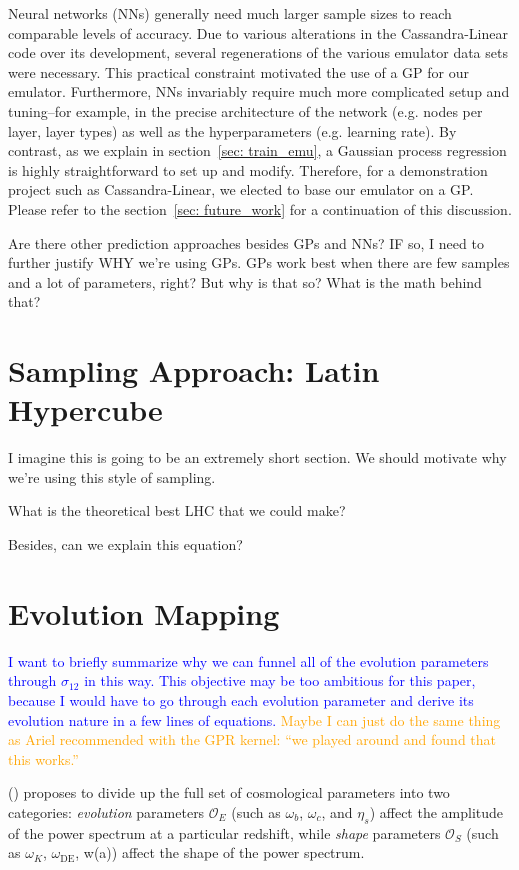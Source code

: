 Neural networks (NNs) generally need much larger sample sizes to reach
comparable levels of
accuracy. Due to various alterations in the Cassandra-Linear code over its
development, several regenerations of the various emulator data sets were
necessary. This practical constraint motivated the use of a GP for our
emulator. Furthermore, NNs invariably require much more complicated setup and
tuning--for example, in the precise architecture of the network (e.g. nodes
per layer, layer types) as well as the hyperparameters (e.g. learning rate).
By contrast, as we explain in section~\ref{sec: train_emu}, a Gaussian
process regression is highly straightforward to set up and modify. Therefore,
for a demonstration project such as Cassandra-Linear, we elected to base our
emulator on a GP. Please refer to the section~\ref{sec: future_work} for a
continuation of this discussion.

Are there other prediction approaches besides GPs and NNs? IF so, I need to
further justify WHY we’re using GPs.
GPs work best when there are few samples and a lot of parameters, right?
But why is that so? What is the math behind that?


\section{Sampling Approach: Latin Hypercube}
\label{sec: lhc_theory}

I imagine this is going to be an extremely short section. We should motivate why we're using this style of sampling.

What is the theoretical best LHC that we could make?

Besides, can we explain this equation?


\section{Evolution Mapping}
\label{sec: ev_mapping_intro}

\textcolor{blue}{I want to briefly summarize why we can funnel all of the 
evolution parameters through $\sigma_{12}$ in this way. This objective may be
too ambitious for this paper, because I would have to go through each
evolution parameter and derive its evolution nature in a few lines of 
equations.} \textcolor{orange}{Maybe I can just do the same thing as Ariel
recommended with the GPR kernel: ``we played around and found that this
works.''}

() proposes to divide up the full set of cosmological
parameters into two categories: \textit{evolution} parameters $\mathcal{O}_E$
(such as $\omega_b$, $\omega_c$, and $\eta_s$)
affect the amplitude of the power spectrum at a particular redshift, while
\textit{shape} parameters $\mathcal{O}_S$
(such as $\omega_K$, $\omega_\text{DE}$, w(a))
affect the shape of the power
spectrum.

